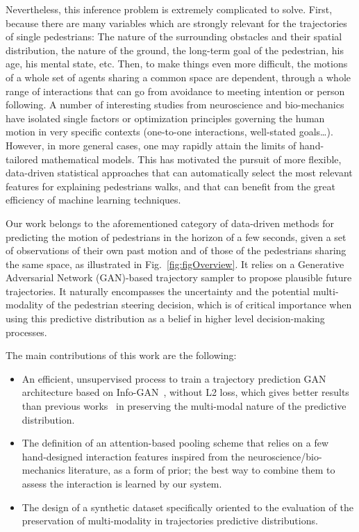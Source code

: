 \documentclass[10pt,twocolumn,letterpaper]{article}
\begin{document}
Nevertheless, this inference problem is extremely complicated to solve. First, because there are many variables which are strongly relevant for the trajectories of single pedestrians: The nature of the surrounding obstacles and their spatial distribution, the nature of the ground, the long-term goal of the pedestrian, his age, his mental state, etc. Then, to make things even more difficult, the motions of a whole set of agents sharing a common space are dependent, through a whole range of interactions that can go from avoidance to meeting intention or person following. A number of interesting studies from neuroscience and bio-mechanics have isolated single factors or optimization principles governing the human motion in very specific contexts (one-to-one interactions, well-stated goals\dots). However, in more general cases, one may rapidly attain the limits of hand-tailored mathematical models. This has motivated the pursuit of more flexible, data-driven statistical approaches that can automatically select the most relevant features for explaining pedestrians walks, and that can benefit from the great efficiency of machine learning techniques.


Our work belongs to the aforementioned category of data-driven methods for predicting the motion of pedestrians in the horizon of a few seconds, given a set of observations of their own past motion and of those of the pedestrians sharing the same space, as illustrated in Fig.~\ref{fig:figOverview}. It relies on a Generative Adversarial Network (GAN)-based trajectory sampler to propose plausible future trajectories. It naturally encompasses the uncertainty and the potential multi-modality of the pedestrian steering decision, which is of critical importance when using this predictive distribution as a belief in higher level decision-making processes.


The main contributions of this work are the following:

\begin{itemize}[leftmargin=*]

\vspace{-0.2cm}
\item An efficient, unsupervised process to train a trajectory prediction GAN architecture based on Info-GAN~\cite{Infogan2016}, without L2 loss, which gives better results than  previous works~\cite{SocialGAN2018,SoPhie2018} in preserving the multi-modal nature of the predictive distribution.

\vspace{-0.2cm}
\item The definition of an attention-based pooling scheme that relies on a few hand-designed interaction features inspired from the neuroscience/bio-mechanics literature, as a form of prior; the best way to combine them to assess the interaction is learned by our system.

\vspace{-0.2cm}
\item The design of a synthetic dataset specifically oriented to the evaluation of the preservation of multi-modality in trajectories predictive distributions.
\vspace{-0.2cm}
\end{itemize}
  
\end{document}

